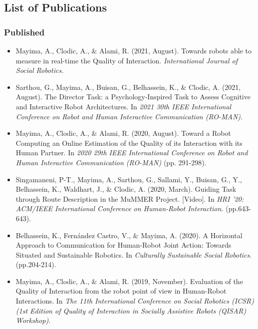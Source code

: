 \documentclass[a4paper,11pt,twoside]{StyleThese}
\begin{document}
\subsection*{List of Publications}
\subsubsection*{Published}
\begin{itemize}
\item Mayima, A., Clodic, A., \& Alami, R. (2021, August). Towards robots able to measure in real-time the Quality of Interaction. \textit{International Journal of Social Robotics.} 

\item Sarthou, G., Mayima, A., Buisan, G., Belhassein, K., \& Clodic, A. (2021, August). The Director Task: a Psychology-Inspired Task to Assess Cognitive and Interactive Robot Architectures. In \textit{2021 30th IEEE International Conference on Robot and Human Interactive Communication (RO-MAN)}.

\item  Mayima, A., Clodic, A., \& Alami, R. (2020, August). Toward a Robot Computing an Online Estimation of the Quality of its Interaction with its Human Partner. In \textit{2020 29th IEEE International Conference on Robot and Human Interactive Communication (RO-MAN)} (pp. 291-298).

\item Singamaneni, P-T., Mayima, A., Sarthou, G., Sallami, Y., Buisan, G., Y., Belhassein, K., Waldhart, J., \& Clodic, A. (2020, March). Guiding Task through Route Description in the MuMMER Project. [Video]. In \textit{HRI '20: ACM/IEEE International Conference on Human-Robot Interaction.} (pp.643-643).

\item Belhassein, K., Fernández Castro, V., \& Mayima, A. (2020). A Horizontal Approach to Communication for Human-Robot Joint Action: Towards Situated and Sustainable Robotics. In \textit{Culturally Sustainable Social Robotics}. (pp.204-214).

\item  Mayima, A., Clodic, A., \& Alami, R. (2019, November). Evaluation of the Quality of Interaction from the robot point of view in Human-Robot Interactions. In \textit{ The 11th International Conference on Social Robotics (ICSR) (1st Edition of Quality of Interaction in Socially Assistive Robots (QISAR) Workshop)}.
\end{itemize}
\end{document}
